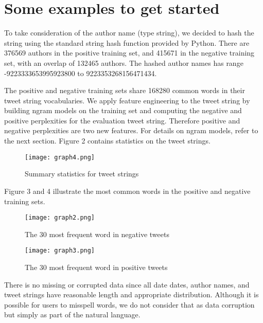 \documentclass[a4paper]{article}
\begin{document}
\section{Some examples to get started}
\begin{flushleft}
To take consideration of the author name (type string), we decided to hash the string using the standard string hash function provided by Python. There are 376569 authors in the positive training set, and 415671 in the negative training set, with an overlap of 132465 authors. The hashed author names has range -9223333653995923800 to 9223353268156471434. 
\end{flushleft}
\begin{flushleft}
The positive and negative training sets share 168280 common words in their tweet string vocabularies. We apply feature engineering to the tweet string by building ngram models on the training set and computing the negative and positive perplexities for the evaluation tweet string. Therefore positive and negative perplexities are two new features. For details on ngram models, refer to the next section. Figure 2 contains statistics on the tweet strings.
\end{flushleft}
\begin{figure}
\centering
\texttt{[image: graph4.png]}
\caption{Summary statistics for tweet strings}
\end{figure}
\begin{flushleft}
Figure 3 and 4 illustrate the most common words in the positive and negative training sets.
\end{flushleft}
\begin{figure}
\centering
\texttt{[image: graph2.png]}
\caption{The 30 most frequent word in negative tweets}
\end{figure}
\begin{figure}
\centering
\texttt{[image: graph3.png]}
\caption{The 30 most frequent word in positive tweets}
\end{figure}
\begin{flushleft}
There is no missing or corrupted data since all date dates, author names, and tweet strings have reasonable length and appropriate distribution. Although it is possible for users to misspell words, we do not consider that as data corruption but simply as part of the natural language. 
\end{flushleft}
\end{document}
